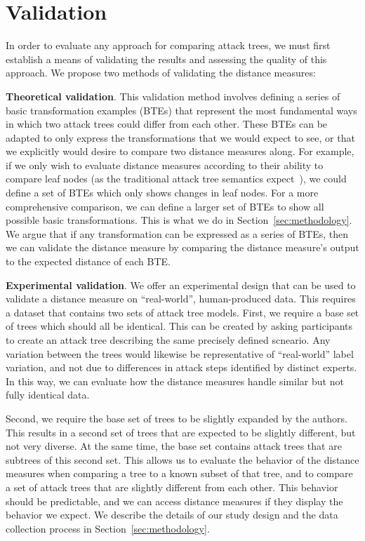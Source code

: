 \section{Validation}
\label{sec:validation}

In order to evaluate any approach for comparing attack trees, we must first establish a means of validating the results and assessing the quality of this approach. We propose two methods of validating the distance measures:

\textbf{Theoretical validation}. This validation method involves defining a series of basic transformation examples (BTEs) that represent the most fundamental ways in which two attack trees could differ from each other. These BTEs can be adapted to only express the transformations that we would expect to see, or that we explicitly would desire to compare two distance measures along. For example, if we only wish to evaluate distance measures according to their ability to compare leaf nodes (as the traditional attack tree semantics expect~\cite{mauwFoundationsAttackTrees2006}), we could define a set of BTEs which only shows changes in leaf nodes. For a more comprehensive comparison, we can define a larger set of BTEs to show all possible basic transformations. This is what we do in Section~\ref{sec:methodology}. We argue that if any transformation can be expressed as a series of BTEs, then we can validate the distance measure by comparing the distance measure's output to the expected distance of each BTE.

\textbf{Experimental validation}. We offer an experimental design that can be used to validate a distance measure on ``real-world'', human-produced data. This requires a dataset that contains two sets of attack tree models. First, we require a base set of trees which should all be identical. This can be created by asking participants to create an attack tree describing the same precisely defined scneario. Any variation between the trees would likewise be representative of ``real-world'' label variation, and not due to differences in attack steps identified by distinct experts. In this way, we can evaluate how the distance measures handle similar but not fully identical data. 

Second, we require the base set of trees to be slightly expanded by the authors. This results in a second set of trees that are expected to be slightly different, but not very diverse. At the same time, the base set contains attack trees that are subtrees of this second set. This allows us to evaluate the behavior of the distance measures when comparing a tree to a known subset of that tree, and to compare a set of attack trees that are slightly different from each other. This behavior should be predictable, and we can access distance measures if they display the behavior we expect. We describe the details of our study design and the data collection process in Section~\ref{sec:methodology}.